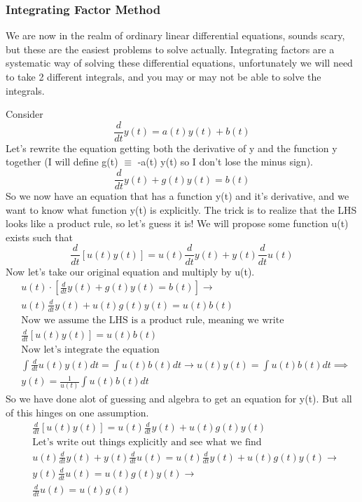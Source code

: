 \documentclass{article}
\begin{document}
\subsubsection{Integrating Factor Method}
We are now in the realm of ordinary linear differential equations, sounds scary, but these are the easiest problems to solve actually. 
Integrating factors are a systematic way of solving these differential equations, unfortunately we will need to take 2 different integrals, and you may or may not be able to solve the integrals.

Consider 
\begin{equation}
    \frac{d}{dt} y(t) = a(t) y(t) + b(t)
\end{equation}
Let's rewrite the equation getting both the derivative of y and the function y together (I will define g(t) $\equiv$ -a(t) y(t) so I don't lose the minus sign). 
\begin{equation}
    \frac{d}{dt} y(t) + g(t)y(t) = b(t)
\end{equation}
So we now have an equation that has a function y(t) and it's derivative, and we want to know what function y(t) is explicitly.
The trick is to realize that the LHS looks like a product rule, so let's guess it is!
We will propose some function u(t) exists such that
\begin{equation}
    \frac{d}{dt}\left[ u(t)y(t) \right] = u(t)\frac{d}{dt}y(t) + y(t)\frac{d}{dt}u(t)
\end{equation}
Now let's take our original equation and multiply by u(t). 
\begin{equation}
\begin{split}
    &u(t) \cdot \left[\frac{d}{dt} y(t) + g(t)y(t) = b(t)\right] \rightarrow\\
    &u(t)\frac{d}{dt} y(t) + u(t)g(t)y(t) = u(t)b(t)\\
    &\text{Now we assume the LHS is a product rule, meaning we write} \\
    &\frac{d}{dt}[u(t)y(t)] = u(t)b(t) \\
    &\text{Now let's integrate the equation} \\
    &\int \frac{d}{dt}u(t)y(t)dt = \int u(t)b(t)dt \rightarrow u(t)y(t) = \int u(t)b(t)dt \implies \\
    &y(t) = \frac{1}{u(t)} \int u(t)b(t)dt
    \end{split}
\end{equation}
So we have done alot of guessing and algebra to get an equation for y(t). 
But all of this hinges on one assumption. 
\begin{equation}
\begin{split}
&\frac{d}{dt}[u(t)y(t)] = u(t) \frac{d}{dt}y(t) + u(t)g(t)y(t)\\
&\text{Let's write out things explicitly and see what we find} \\
&u(t)\frac{d}{dt}y(t) + y(t)\frac{d}{dt}u(t) = u(t)\frac{d}{dt}y(t) + u(t)g(t)y(t) \rightarrow \\
&y(t)\frac{d}{dt}u(t) = u(t)g(t)y(t) \rightarrow \\
&\frac{d}{dt}u(t) = u(t)g(t)
\end{split}
\end{equation}
\end{document}
